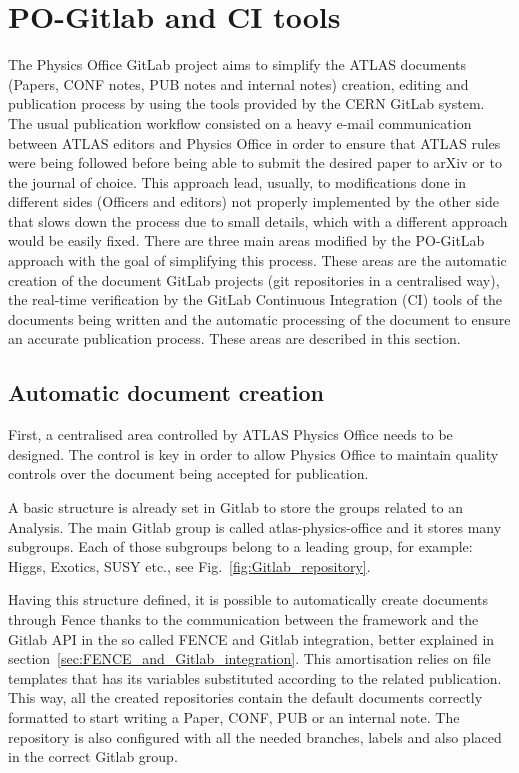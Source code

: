\section{PO-Gitlab and CI tools}
\label{sec:PO-Gitlab_and_CI_tools}

The Physics Office GitLab project aims to simplify the ATLAS documents (Papers, CONF notes, PUB notes and internal notes) creation, editing and publication process by using the tools provided by the CERN GitLab system. The usual publication workflow consisted on a heavy e-mail communication between ATLAS editors and Physics Office in order to ensure that ATLAS rules were being followed before being able to submit the desired paper to arXiv or to the journal of choice. This approach lead, usually, to modifications done in different sides (Officers and editors) not properly implemented by the other side that slows down the process due to small details, which with a different approach would be easily fixed. 
There are three main areas modified by the PO-GitLab approach with the goal of simplifying this process. These areas are the automatic creation of the document GitLab projects (git repositories in a centralised way), the real-time verification by the GitLab Continuous Integration (CI) tools of the documents being written and the automatic processing of the document to ensure an accurate publication process. These areas are described in this section. 

\subsection{Automatic document creation}
\label{sec:Automatic_document_creation}

First, a centralised area controlled by ATLAS Physics Office needs to be designed. The control is key in order to allow Physics Office to maintain quality controls over the document being accepted for publication.

A basic structure is already set in Gitlab to store the groups related to an Analysis. The main Gitlab group is called atlas-physics-office and it stores many subgroups. Each of those subgroups belong to a leading group, for example: Higgs, Exotics, SUSY etc., see Fig.~\ref{fig:Gitlab_repository}.

Having this structure defined, it is possible to automatically create documents through Fence thanks to the communication between the framework and the Gitlab API in the so called FENCE and Gitlab integration, better explained in section~\ref{sec:FENCE_and_Gitlab_integration}. This amortisation relies on file templates that has its variables substituted according to the related publication. This way, all the created repositories contain the default documents correctly formatted to start writing a Paper, CONF, PUB or an internal note. The repository is also configured with all the needed branches, labels and also placed in the correct Gitlab group.

